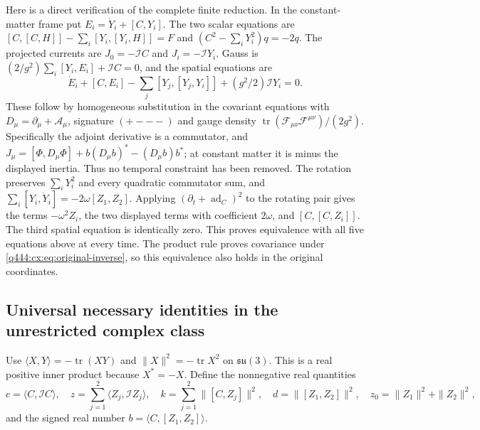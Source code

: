 Here is a direct verification of the complete finite reduction. In the
constant-matter frame put $E_i=\dot Y_i+[C,Y_i]$. The two scalar
equations are
$[C,[C,H]]-\sum_i[Y_i,[Y_i,H]]=F$ and
$(C^2-\sum_iY_i^2)q=-2q$.
The projected currents are $J_0=-\mathcal IC$ and $J_i=-\mathcal IY_i$.
Gauss is $(2/g^2)\sum_i[Y_i,E_i]+\mathcal IC=0$, and the spatial
equations are
\[
 \dot E_i+[C,E_i]-\sum_j[Y_j,[Y_j,Y_i]]+(g^2/2)\mathcal IY_i=0.
\]
These follow by homogeneous substitution in the covariant equations with
$D_\mu=\partial_\mu+\mathcal A_\mu$, signature $(+---)$ and gauge
density $\operatorname{tr}(\mathcal F_{\mu\nu}\mathcal F^{\mu\nu})/(2g^2)$.
Specifically the adjoint derivative is a commutator, and
$J_\mu=[\Phi,D_\mu\Phi]+b(D_\mu b)^*-(D_\mu b)b^*$; at constant
matter it is minus the displayed inertia. Thus no temporal constraint
has been removed.
The rotation preserves $\sum_iY_i^2$ and every quadratic commutator sum,
and
$\sum_i[Y_i,\dot Y_i]=-2\omega[Z_1,Z_2]$.
Applying $(\partial_t+\operatorname{ad}_C)^2$ to the rotating pair
gives the terms $-\omega^2Z_i$, the two displayed terms with coefficient
$2\omega$, and $[C,[C,Z_i]]$. The third spatial equation is identically
zero. This proves equivalence with all five equations above at every time.
The product rule proves covariance under \eqref{q444:cx:eq:original-inverse},
so this equivalence also holds in the original coordinates.

\subsection{Universal necessary identities in the unrestricted complex class}

Use $\langle X,Y\rangle=-\operatorname{tr}(XY)$ and $\|X\|^2=-\operatorname{tr} X^2$ on
$\mathfrak{su}(3)$. This is a real positive inner product because $X^*=-X$.
Define the nonnegative real quantities
\[
 c=\langle C,\mathcal IC\rangle,\quad
 z=\sum_{j=1}^2\langle Z_j,\mathcal IZ_j\rangle,\quad
 k=\sum_{j=1}^2\|[C,Z_j]\|^2,\quad
 d=\|[Z_1,Z_2]\|^2,\quad z_0=\|Z_1\|^2+\|Z_2\|^2,
\]
and the signed real number $b=\langle C,[Z_1,Z_2]\rangle$.

